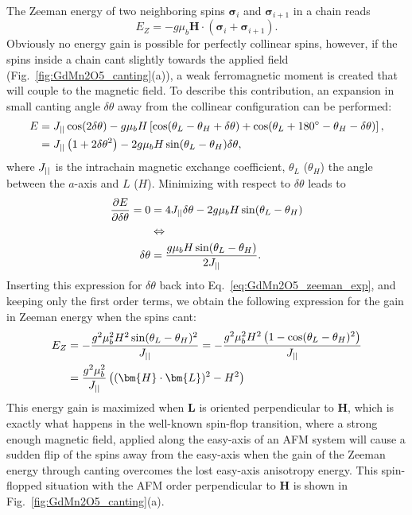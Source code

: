 The Zeeman energy of two neighboring spins $\pmb{\sigma}_{i}$ and $\pmb{\sigma}_{i+1}$ in a chain reads
\begin{equation}
	E_Z = -g \mu_b \bm{H} \cdot (\pmb{\sigma}_i + \pmb{\sigma}_{i+1})\nonumber.
\end{equation}
Obviously no energy gain is possible for perfectly collinear spins, however, if the spins inside a chain cant slightly towards the applied field (Fig.~\ref{fig:GdMn2O5_canting}(a)), a weak ferromagnetic moment is created that will couple to the magnetic field.
To describe this contribution, an expansion in small canting angle $\delta \theta$ away from the collinear configuration can be performed:
\begin{align}
	E &= J_{||} \cos(2\delta \theta) - g \mu_b H \left[\cos(\theta_L - \theta_H + \delta \theta) + \cos(\theta_L + 180^\circ - \theta_H - \delta \theta)\right],\nonumber\\
	&= J_{||} \left( 1+2\delta\theta^2 \right) - 2 g \mu_b H \sin(\theta_L - \theta_H)\delta\theta \label{eq:GdMn2O5_zeeman_exp},
\end{align}
where $J_{||}$ is the intrachain magnetic exchange coefficient, $\theta_L$ ($\theta_H$) the angle between the $a$-axis and $L$ ($H$).
Minimizing with respect to $\delta \theta$ leads to
\begin{align}
	\frac{\partial E}{\partial \delta \theta} = 0 &= 4 J_{||} \delta \theta - 2 g \mu_b H \sin(\theta_L - \theta_H) \nonumber\\
	&\Leftrightarrow \nonumber\\
	\delta \theta &= \frac{g\mu_b H \sin(\theta_L - \theta_H)}{2 J_{||}}.\nonumber
\end{align}
Inserting this expression for $\delta \theta$ back into Eq.~\eqref{eq:GdMn2O5_zeeman_exp}, and keeping only the first order terms, we obtain the following expression for the gain in Zeeman energy when the spins cant:
\begin{align}
	E_Z &= -\frac{g^2\mu_b^2 H^2 \sin(\theta_L - \theta_H)^2}{\Jpar} = -\frac{g^2\mu_b^2 H^2 \left(1 - \cos(\theta_L - \theta_H)^2\right)}{\Jpar} \nonumber\\
	&=\frac{g^2\mu_b^2}{\Jpar}\left((\bm{H}\cdot\bm{L})^2 - H^2\right)\nonumber
\end{align}
This energy gain is maximized when $\bm{L}$ is oriented perpendicular to $\bm{H}$, which is exactly what happens in the well-known spin-flop transition, where a strong enough magnetic field, applied along the easy-axis of an AFM system will cause a sudden flip of the spins away from the easy-axis when the gain of the Zeeman energy through canting overcomes the lost easy-axis anisotropy energy. This spin-flopped situation with the AFM order perpendicular to $\bm{H}$ is shown in Fig.~\ref{fig:GdMn2O5_canting}(a).

